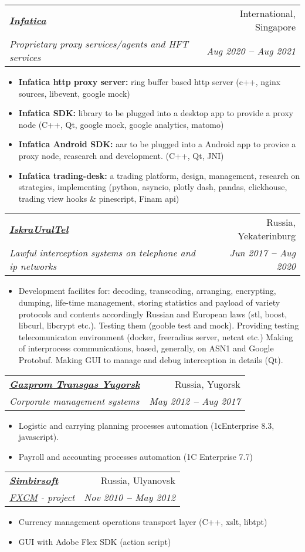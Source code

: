 \documentclass[letterpaper,11pt]{article}
\makeatletter
\newcommand{\resumeItem}[1]{
  \item\small{
    {#1 \vspace{-2pt}}
  }
}
\newcommand{\resumeSubheading}[4]{
  \vspace{-2pt}\item
    \begin{tabular*}{0.97\textwidth}[t]{l@{\extracolsep{\fill}}r}
      \textbf{#1} & #2 \\
      \textit{\small#3} & \textit{\small #4} \\
    \end{tabular*}\vspace{-7pt}
}
\newcommand{\resumeItemListStart}{\begin{itemize}}
\newcommand{\resumeItemListEnd}{\end{itemize}\vspace{-5pt}}
\makeatother
\begin{document}
    \resumeSubheading
      {\emph{\href{http://https://infatica.io/}{\color{blue}Infatica}}}{International, Singapore}
      { Proprietary proxy services/agents and HFT services }{Aug 2020 \textbf{--} Aug 2021}
        \resumeItemListStart
            \resumeItem{ \textbf{Infatica http proxy server: } ring buffer based http server (c++, nginx sources, libevent, google mock) }
            \resumeItem{ \textbf{Infatica SDK: } library to be plugged into a desktop app to provide a proxy node (C++, Qt, google mock, google analytics, matomo) }
            \resumeItem{ \textbf{Infatica Android SDK: } aar to be plugged into a Android app to provice a proxy node, reasearch and development. (C++, Qt, JNI)}
            \resumeItem{ \textbf{Infatica trading-desk: } a trading platform, design, management, research on strategies, implementing (python, asyncio, plotly dash, pandas, clickhouse, trading view hooks \& pinescript, Finam api)}
        \resumeItemListEnd

    \resumeSubheading
      {\emph{\href{https://iskrauraltel.ru/ru/}{\color{blue}IskraUralTel}}}{Russia, Yekaterinburg}
      {Lawful interception systems on telephone and ip networks}{Jun 2017 \textbf{--} Aug 2020}
        \resumeItemListStart
            \resumeItem{ Development facilites for: decoding, transcoding, arranging, encrypting, dumping, life-time management, storing statistics and payload of variety protocols and contents accordingly Russian and European laws (stl, boost, libcurl, libcrypt etc.). Testing them (gooble test and mock). Providing testing telecomunicaton environment (docker, freeradius server, netcat etc.) Making of interprocess communications, based, generally, on ASN1 and Google Protobuf. Making GUI to manage and debug interception in details (Qt).}
        \resumeItemListEnd

    \resumeSubheading
      {\emph{\href{https://yugorsk-tr.gazprom.ru/}{\color{blue}Gazprom Transgas Yugorsk}}}{Russia, Yugorsk}
      {Corporate management systems}{May 2012 \textbf{--} Aug 2017}
        \resumeItemListStart
            \resumeItem{ Logistic and carrying planning processes automation (1сEnterprise 8.3, javascript). }
            \resumeItem{ Payroll and accounting processes automation (1C Enterprise 7.7) }
        \resumeItemListEnd


    \resumeSubheading
      {\emph{\href{https://simbirsoft.com}{\color{blue}Simbirsoft}}}{Russia, Ulyanovsk}
      {\emph{\href{https://www.fxcm.com/markets/}{\color{blue}FXCM}} - project}{Nov 2010 \textbf{--} May 2012}
        \resumeItemListStart
        \resumeItem{ Currency management operations transport layer (C++, xslt, libtpt) }
        \resumeItem{ GUI with Adobe Flex SDK (action script) }
        \resumeItemListEnd
\end{document}
